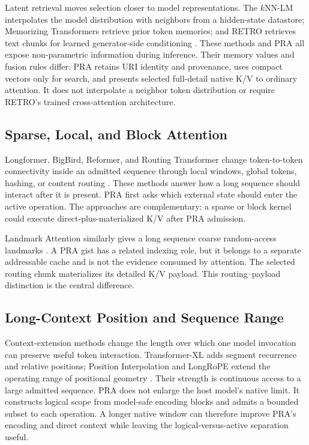 \documentclass[11pt]{article}
\begin{document}
Latent retrieval moves selection closer to model representations. The $k$NN-LM interpolates
the model distribution with neighbors from a hidden-state datastore; Memorizing Transformers
retrieve prior token memories; and RETRO retrieves text chunks for learned generator-side
conditioning \cite{khandelwal2020knnlm,wu2022memorizing,borgeaud2022retro}. These methods and
PRA all expose non-parametric information during inference. Their memory values and fusion
rules differ: PRA retains URI identity and provenance, uses compact vectors only for search,
and presents selected full-detail native K/V to ordinary attention. It does not interpolate a
neighbor token distribution or require RETRO's trained cross-attention architecture.

\subsection{Sparse, Local, and Block Attention}

Longformer, BigBird, Reformer, and Routing Transformer change token-to-token connectivity
inside an admitted sequence through local windows, global tokens, hashing, or content routing
\cite{beltagy2020longformer,zaheer2020bigbird,kitaev2020reformer,roy2021routing}. These methods
answer how a long sequence should interact after it is present. PRA first asks which external
state should enter the active operation. The approaches are complementary: a sparse or block
kernel could execute direct-plus-materialized K/V after PRA admission.

Landmark Attention similarly gives a long sequence coarse random-access landmarks
\cite{mohtashami2023landmark}. A PRA gist has a related indexing role, but it belongs to a
separate addressable cache and is not the evidence consumed by attention. The selected routing
chunk materializes its detailed K/V payload. This routing--payload distinction is the central
difference.

\subsection{Long-Context Position and Sequence Range}

Context-extension methods change the length over which one model invocation can preserve useful
token interaction. Transformer-XL adds segment recurrence and relative positions; Position
Interpolation and LongRoPE extend the operating range of positional geometry
\cite{dai2019transformerxl,chen2023positioninterpolation,ding2024longrope}. Their strength is
continuous access to a large admitted sequence. PRA does not enlarge the host model's native
limit. It constructs logical scope from model-safe encoding blocks and admits a bounded subset
to each operation. A longer native window can therefore improve PRA's encoding and direct
context while leaving the logical-versus-active separation useful.
\end{document}

